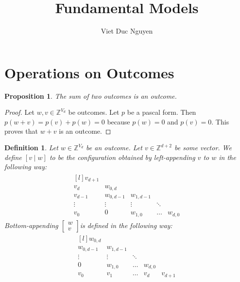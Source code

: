 \documentclass[11pt]{article}
\newtheorem{proposition}[theorem]{Proposition}
\newtheorem{definition}[theorem]{Definition}
\begin{document}
\author{Viet Duc Nguyen}
\title{Fundamental Models}
\maketitle

\section{Operations on Outcomes}

\begin{proposition}
 The sum of two outcomes is an outcome. 
\end{proposition}

\begin{proof}
  Let $w,v \in \mathbb{Z}^{V_{d}}$ be outcomes. Let $p$ be a pascal form. Then $p(w + v) = p(v) + p(w) = 0$ because $p(w) = 0$ and $p(v) = 0$. This proves that $w + v$ is an outcome.
\end{proof}


\begin{definition}
  Let $w \in \mathbb{Z}^{V_{d}}$ be an outcome. Let $v \in \mathbb{Z}^{d+2}$ be some vector. We define $[v \mid w]$ to be the configuration obtained by left-appending $v$ to $w$ in the following way:
\begin{align*}
  \begin{matrix*}[l]
    v_{d + 1} & &  \\
    v_{d} &  w_{0,d} & \\
  v_{d-1}  &  w_{0,d-1}  &  w_{1,d - 1} \\
  \vdots & \vdots & \vdots & \ddots \\
  v_0  & 0 & w_{1,0}  & \dots & w_{d,0}
 \end{matrix*} 
\end{align*}
Bottom-appending $\begin{bmatrix} w \\ \hline v\end{bmatrix}$is defined in the following way:
\begin{align*}
  \begin{matrix*}[l]
    w_{0,d} & & & \\
      w_{0,d-1} & w_{1,d - 1} &  &   \\
    \vdots & \vdots & \ddots & \\
    0 & w_{1,0}  & \dots &  w_{d,0} \\
    v_{0} & v_{1} & \dots & v_{d} & v_{d + 1}
 \end{matrix*}
\end{align*}
\end{definition}
\end{document}
